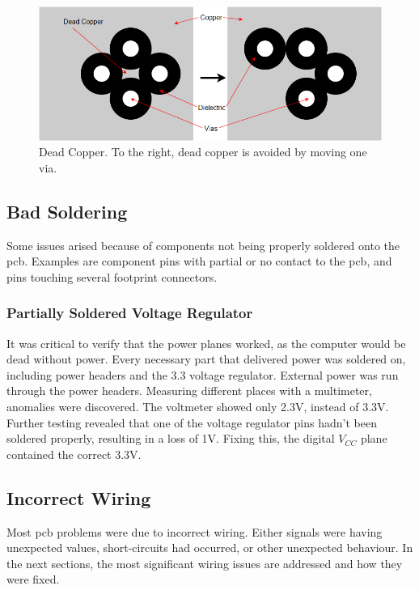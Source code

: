 \begin{figure}[h!]
\centering
\includegraphics[scale = 0.4]{images/Dead_Copper.png}
\caption{Dead Copper. To the right, dead copper is avoided by moving one via.}
\label{fig:Dead copper}
\end{figure}

\subsection{Bad Soldering}
Some issues arised because of components not being properly soldered onto the \gls{pcb}. Examples are component pins with partial or no contact to the \gls{pcb}, and pins touching several footprint connectors.

\subsubsection{Partially Soldered Voltage Regulator}
It was critical to verify that the power planes worked, as the computer would be dead without power.
Every necessary part that delivered power was soldered on, including power headers and the 3.3 voltage regulator.
External power was run through the power headers.
Measuring different places with a multimeter, anomalies were discovered.
The voltmeter showed only 2.3V, instead of 3.3V.
Further testing revealed that one of the voltage regulator pins hadn't been soldered properly, resulting in a loss of 1V.
Fixing this, the digital \(V_{CC}\) plane contained the correct 3.3V.

\subsection{Incorrect Wiring}
Most \gls{pcb} problems were due to incorrect wiring.
Either signals were having unexpected values, short-circuits had occurred, or other unexpected behaviour.
In the next sections, the most significant wiring issues are addressed and how they were fixed.

